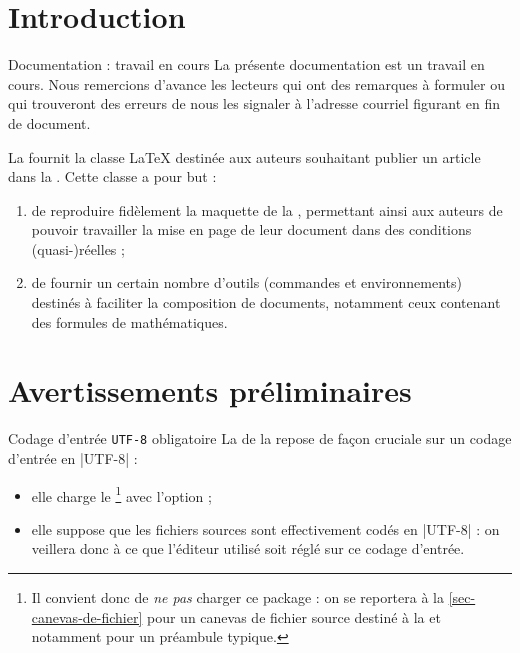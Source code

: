 \section{Introduction}
\label{sec-introduction}

\begin{dbremark}{Documentation : travail en cours}{}
  La présente documentation est un travail en cours. Nous remercions d'avance
  les lecteurs qui ont des remarques à formuler ou qui trouveront des erreurs de
  nous les signaler à l'adresse courriel figurant en fin de document.
\end{dbremark}

La \smf fournit la classe \LaTeX{} \gztauthor{} destinée aux auteurs souhaitant
publier un article dans la
\href{http://smf4.emath.fr/Publications/Gazette/}{\gzt*{}}. Cette classe a pour
but :
\begin{enumerate}
\item de reproduire fidèlement la maquette de la \gzt{}, permettant ainsi aux
  auteurs de pouvoir travailler la mise en page de leur document dans des
  conditions (quasi-)réelles ;
\item de fournir un certain nombre d'outils (commandes et environnements)
  destinés à faciliter la composition de documents, notamment ceux contenant des
  formules de mathématiques.
\end{enumerate}

\section{Avertissements préliminaires}
\label{sec-avert-prel}

\begin{dbwarning}{Codage d'entrée \protect\lstinline+UTF-8+ obligatoire}{}
  La \gztauthorcl{} de la \gzt{} repose de façon cruciale sur un codage
  d'entrée en |UTF-8| :
  \begin{itemize}
  \item elle charge le \footnote{%
      Il convient donc de \emph{ne pas} charger ce package : on se reportera
      à la \vref{sec-canevas-de-fichier} pour un canevas de fichier source
      destiné à la \gzt{} et notamment pour un préambule typique.%
    } avec l'option  ;
  \item elle suppose que les fichiers sources  sont effectivement
    codés en |UTF-8| : on veillera donc à ce que l'éditeur utilisé soit réglé
    sur ce codage d'entrée.
  \end{itemize}
\end{dbwarning}

